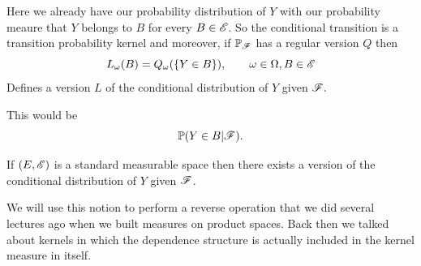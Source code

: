\documentclass{report}
\begin{document}
 Here we already have our probability distribution of $Y$ with our probability meaure that $Y$ belongs to $B$ for every $B\in\mathscr{E}$. So the conditional transition is a transition probability kernel and moreover, if $\mathbb{P}_{\mathscr{F}}$ has a regular version $Q$ then 
 \begin{equation*}
 	L_\omega (B)=Q_\omega (\{Y\in B\}),\qquad\omega\in\Omega,B\in\mathscr{E}
 \end{equation*}
 Defines a version $L$ of the conditional distribution of $Y$ given $\mathscr{F}.$
 \begin{notation}
 	This would be 
 	\[\mathbb{P}(Y\in B|\mathscr{F}).\]
 \end{notation}
 \begin{theorem}
 	If $(E,\mathscr{E})$ is a standard measurable space then there exists a version of the conditional distribution of $Y$ given $\mathscr{F}$.
 \end{theorem}
 We will use this notion to perform a reverse operation that we did several lectures ago when we built measures on product spaces. Back then we talked about kernels in which the dependence structure is actually included in the kernel measure in itself.
\end{document}

